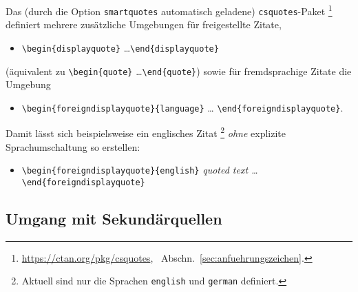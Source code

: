 Das (durch die Option \texttt{smartquotes} automatisch geladene)
\texttt{csquotes}-Paket%
\footnote{\url{https://ctan.org/pkg/csquotes}, \sa\ Abschn.\
\ref{sec:anfuehrungszeichen}.}
definiert mehrere zusätzliche Umgebungen für freigestellte Zitate, \zB\
%
\begin{itemize}
    \item[] \verb!\begin{displayquote}! \ldots \verb!\end{displayquote}!
\end{itemize}
%
(äquivalent zu \verb!\begin{quote}! \ldots \verb!\end{quote}!) sowie für
fremdsprachige Zitate die Umgebung
%
\begin{itemize}
    \item[] \verb!\begin{foreigndisplayquote}{language}! \ldots
    \verb!\end{foreigndisplayquote}!.
\end{itemize}
%
Damit lässt sich beispielsweise ein englisches Zitat%
\footnote{Aktuell sind nur die Sprachen \texttt{english} und \texttt{german}
definiert.}
\emph{ohne} explizite Sprachumschaltung so erstellen:
%
\begin{itemize}
    \item[] \verb!\begin{foreigndisplayquote}{english}!\newline
    \emph{quoted text \ldots}\newline
    \verb!\end{foreigndisplayquote}!
\end{itemize}


\subsection{Umgang mit Sekundärquellen}

